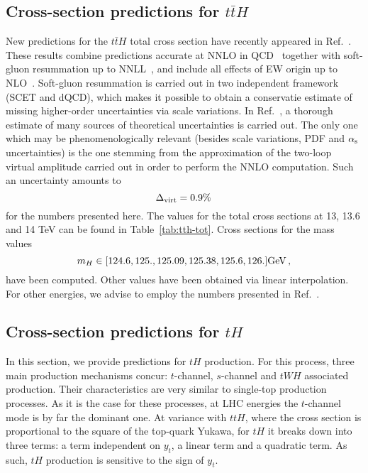 
\subsection{Cross-section predictions for $t\bar t H$}
\label{sec:results-xsects-tth}
New predictions for the $t\bar t H$ total cross section have recently appeared in Ref.~\cite{Balsach:2025jcw}. These results
combine predictions accurate at NNLO in QCD~\cite{Catani:2022mfv,Devoto:2024nhl} together with soft-gluon resummation up to NNLL~\cite{Kulesza:2015vda,Broggio:2015lya,Broggio:2016lfj,
Kulesza:2017ukk,Kulesza:2018tqz,Broggio:2019ewu,Kulesza:2020nfh}, and include all effects of EW origin up to NLO~\cite{Frixione:2014qaa,Frixione:2015zaa,Frederix:2018nkq}.
Soft-gluon resummation is carried out in two independent framework (SCET and dQCD), which makes it possible to obtain a conservatie estimate of missing higher-order
uncertainties via scale variations. In Ref.~\cite{Balsach:2025jcw}, a thorough estimate of many sources of theoretical uncertainties is carried out.
The only one which may be phenomenologically relevant (besides scale variations, PDF and $\alpha_{\mathrm{s}}$ uncertainties) is the one stemming 
from the approximation of the two-loop virtual amplitude carried out in order to perform the NNLO computation. Such an uncertainty amounts to
\begin{equation}
    \Delta_{\rm virt} = 0.9\%\,
\end{equation}
for the numbers presented here.
The values for the total cross sections at 13, 13.6 and 14 TeV can be found in Table~\ref{tab:tth-tot}. Cross sections
for the mass values
\begin{equation}
    m_H \in [ 124.6, 125., 125.09, 125.38, 125.6, 126.] \rm GeV\,,
\end{equation}
have been computed. Other values have been obtained via linear interpolation.
For other energies, we advise to employ the numbers
presented in Ref.~\cite{Karlberg:2024zxx}.



\subsection{Cross-section predictions for $t H$}
\label{sec:results-xsects-singleth}
In this section, we provide predictions for $tH$ production. 
For this process, three main production mechanisms concur: 
$t$-channel, $s$-channel and $tWH$ associated production. Their characteristics are very similar to single-top production processes. As it is the case
for these processes, at LHC energies the $t$-channel mode is by far the dominant one. At variance with $ttH$, where the cross section
is proportional to the square of the top-quark Yukawa, for $tH$ it breaks down into three terms: a term independent on $y_t$, a linear term and a quadratic
term. As such, $tH$ production is sensitive to the sign of $y_t$. 

